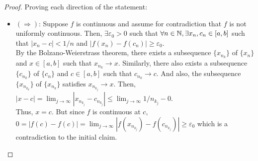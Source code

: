 \begin{proof}
    Proving each direction of the statement:
    \begin{itemize}
        \item $(\Longrightarrow)$: Suppose $f$ is continuous and assume for contradiction that $f$ is not uniformly continuous. Then, $\exists \varepsilon_0 > 0$ such that $\forall n \in \mathbb{N}, \exists x_n, c_n \in [a,b]$ such that $|x_n-c|<1/n$ and $|f(x_n) - f(c_n)| \geq \varepsilon_0$. \\
        By the Bolzano-Weierstrass theorem, there exists a subsequence $\{x_{n_k}\}$ of $\{x_n\}$ and $x \in [a,b]$ such that $x_{n_k} \to x$. Similarly, there also exists a subsequence $\{c_{n_k}\}$ of $\{c_n\}$ and $c \in [a,b]$ such that $c_{n_k} \to c$. And also, the subsequence $\{x_{n_{k_k}}\}$ of $\{x_{n_k}\}$ satisfies $x_{n_{k_j}} \to x$. Then, $|x-c| = \lim_{j \to \infty} |x_{n_{k_j}} - c_{n_{k_j}}| \leq \lim_{j \to \infty} 1/n_{k_j} - 0$. \\
        Thus, $x = c$. But since $f$ is continuous at $c$, $0 = |f(c) - f(c)| = \lim_{j \to \infty} |f(x_{n_{k_j}}) - f(c_{n_{k_j}})| \geq \varepsilon_0$ which is a contradiction to the initial claim.
    \end{itemize}
\end{proof}